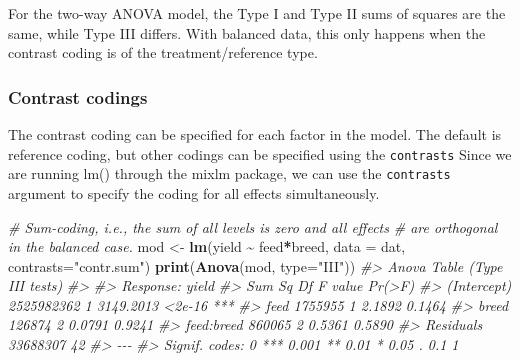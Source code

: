 \documentclass[
]{article}
\newenvironment{Shaded}{\begin{snugshade}}{\end{snugshade}}
\newcommand{\AttributeTok}[1]{\textcolor[rgb]{0.13,0.29,0.53}{#1}}
\newcommand{\CommentTok}[1]{\textcolor[rgb]{0.56,0.35,0.01}{\textit{#1}}}
\newcommand{\FunctionTok}[1]{\textcolor[rgb]{0.13,0.29,0.53}{\textbf{#1}}}
\newcommand{\NormalTok}[1]{#1}
\newcommand{\OtherTok}[1]{\textcolor[rgb]{0.56,0.35,0.01}{#1}}
\newcommand{\SpecialCharTok}[1]{\textcolor[rgb]{0.81,0.36,0.00}{\textbf{#1}}}
\newcommand{\StringTok}[1]{\textcolor[rgb]{0.31,0.60,0.02}{#1}}
\begin{document}
For the two-way ANOVA model, the Type I and Type II sums of squares are
the same, while Type III differs. With balanced data, this only happens
when the contrast coding is of the treatment/reference type.

\subsubsection{Contrast codings}\label{contrast-codings}

The contrast coding can be specified for each factor in the model. The
default is reference coding, but other codings can be specified using
the \texttt{contrasts} Since we are running lm() through the mixlm
package, we can use the \texttt{contrasts} argument to specify the
coding for all effects simultaneously.

\begin{Shaded}
\begin{Highlighting}[]
\CommentTok{\# Sum{-}coding, i.e., the sum of all levels is zero and all effects}
\CommentTok{\# are orthogonal in the balanced case.}
\NormalTok{mod }\OtherTok{\textless{}{-}} \FunctionTok{lm}\NormalTok{(yield }\SpecialCharTok{\textasciitilde{}}\NormalTok{ feed}\SpecialCharTok{*}\NormalTok{breed, }\AttributeTok{data =}\NormalTok{ dat, }\AttributeTok{contrasts=}\StringTok{"contr.sum"}\NormalTok{)}
\FunctionTok{print}\NormalTok{(}\FunctionTok{Anova}\NormalTok{(mod, }\AttributeTok{type=}\StringTok{"III"}\NormalTok{))}
\CommentTok{\#\textgreater{} Anova Table (Type III tests)}
\CommentTok{\#\textgreater{} }
\CommentTok{\#\textgreater{} Response: yield}
\CommentTok{\#\textgreater{}                 Sum Sq Df   F value Pr(\textgreater{}F)    }
\CommentTok{\#\textgreater{} (Intercept) 2525982362  1 3149.2013 \textless{}2e{-}16 ***}
\CommentTok{\#\textgreater{} feed           1755955  1    2.1892 0.1464    }
\CommentTok{\#\textgreater{} breed           126874  2    0.0791 0.9241    }
\CommentTok{\#\textgreater{} feed:breed      860065  2    0.5361 0.5890    }
\CommentTok{\#\textgreater{} Residuals     33688307 42                     }
\CommentTok{\#\textgreater{} {-}{-}{-}}
\CommentTok{\#\textgreater{} Signif. codes:  0 \textquotesingle{}***\textquotesingle{} 0.001 \textquotesingle{}**\textquotesingle{} 0.01 \textquotesingle{}*\textquotesingle{} 0.05 \textquotesingle{}.\textquotesingle{} 0.1 \textquotesingle{} \textquotesingle{} 1}


\end{Highlighting}
\end{Shaded}
\end{document}

